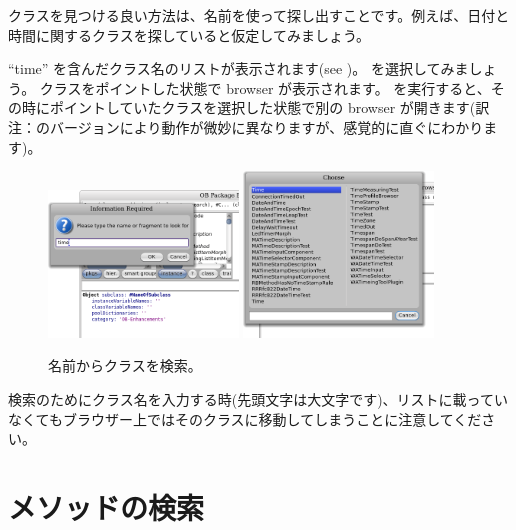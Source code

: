 \documentclass[a4paper,10pt,twoside]{book}
\begin{document}
クラスを見つける良い方法は、名前を使って探し出すことです。例えば、日付と時間に関するクラスを探していると仮定してみましょう。

\noindent
``time'' を含んだクラス名のリストが表示されます(see )。 を選択してみましょう。 クラスをポイントした状態で browser が表示されます。 を実行すると、その時にポイントしていたクラスを選択した状態で別の browser が開きます(訳注：\pharo のバージョンにより動作が微妙に異なりますが、感覚的に直ぐにわかります)。

\begin{figure}[hbt]
\centerline{
	\includegraphics[width=0.45\textwidth]{FindIt}
	\hspace{1cm}
	\includegraphics[width=0.45\textwidth]{TimeClasses}
}
\caption{名前からクラスを検索。
}
\end{figure}

検索のためにクラス名を入力する時(先頭文字は大文字です)、リストに載っていなくてもブラウザー上ではそのクラスに移動してしまうことに注意してください。

\section{メソッドの検索}
\end{document}
